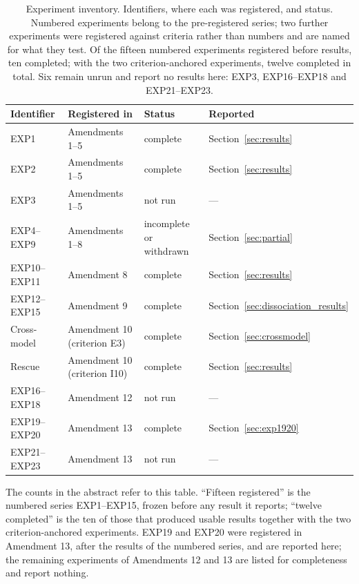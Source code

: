 \documentclass{article}
\begin{document}
\begin{table}[t]
\centering
\small
\caption{Experiment inventory. Identifiers, where each was registered, and status. Numbered
experiments belong to the pre-registered series; two further experiments were registered against
criteria rather than numbers and are named for what they test. Of the fifteen numbered experiments
registered before results, ten completed; with the two criterion-anchored experiments, twelve
completed in total. Six remain unrun and report no results here: EXP3, EXP16--EXP18 and
EXP21--EXP23.}
\label{tab:inventory}
\vspace{0.5\baselineskip}
\begin{tabular}{llll}
\toprule
Identifier & Registered in & Status & Reported \\
\midrule
EXP1 & Amendments 1--5 & complete & Section~\ref{sec:results} \\
EXP2 & Amendments 1--5 & complete & Section~\ref{sec:results} \\
EXP3 & Amendments 1--5 & not run & --- \\
EXP4--EXP9 & Amendments 1--8 & incomplete or withdrawn & Section~\ref{sec:partial} \\
EXP10--EXP11 & Amendment 8 & complete & Section~\ref{sec:results} \\
EXP12--EXP15 & Amendment 9 & complete & Section~\ref{sec:dissociation_results} \\
Cross-model & Amendment 10 (criterion E3) & complete & Section~\ref{sec:crossmodel} \\
Rescue & Amendment 10 (criterion I10) & complete & Section~\ref{sec:results} \\
EXP16--EXP18 & Amendment 12 & not run & --- \\
EXP19--EXP20 & Amendment 13 & complete & Section~\ref{sec:exp1920} \\
EXP21--EXP23 & Amendment 13 & not run & --- \\
\bottomrule
\end{tabular}
\end{table}

The counts in the abstract refer to this table. ``Fifteen registered'' is the numbered series
EXP1--EXP15, frozen before any result it reports; ``twelve completed'' is the ten of those that
produced usable results together with the two criterion-anchored experiments. EXP19 and EXP20
were registered in Amendment 13, after the results of the numbered series, and are reported
here; the remaining experiments of Amendments 12 and 13 are listed for completeness and report
nothing.
\label{sec:results}
\end{document}
